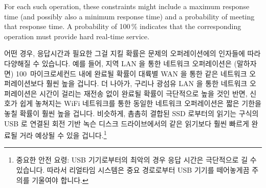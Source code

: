 For each such operation, these constraints might include a maximum
response time (and possibly also a minimum response time) and a
probability of meeting that response time.
A probability of 100\,\% indicates that the corresponding operation
must provide hard real-time service.

\fi

어떤 경우, 응답시간과 필요한 그걸 지킬 확률은 문제의 오퍼레이션에의 인자들에
따라 다양해질 수 있습니다.
예를 들어, 지역 LAN 을 통한 네트워크 오퍼레이션은 (말하자면) 100~마이크로세컨드
내에 완료될 확률이 대륙별 WAN 을 통한 같은 네트워크 오퍼레이션보다 훨씬 높을
겁니다.
더 나아가, 구리나 광섬유 LAN 을 통한 네트워크 오퍼레이션은 시간이 걸리는 재전송
없이 완료될 확률이 극단적으로 높을 것인 반면, 신호가 쉽게 놓쳐지는 WiFi
네트워크를 통한 동일한 네트워크 오퍼레이션은 짧은 기한을 놓칠 확률이 훨씬 높을
겁니다.
비슷하게, 촘촘히 결합된 SSD 로부터의 읽기는 구식의 USB 로 연결된 회전 기반 녹슨
디스크 드라이브에서의 같은 읽기보다 훨씬 빠르게 완료될 거라 예상될 수 있을
겁니다.\footnote{
	중요한 안전 요령:  USB 기기로부터의 최악의 경우 응답 시간은 극단적으로
	길 수 있습니다.
	따라서 리얼타임 시스템은 중요 경로로부터 USB 기기를 떼어놓게끔 주의를
	기울여야 합니다.}

